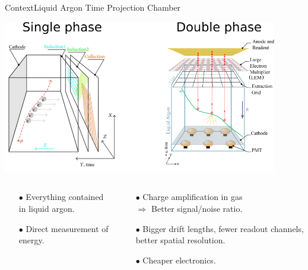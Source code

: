 \documentclass[10pt]{beamer}
\begin{document}
    \begin{frame}{Context}{Liquid Argon Time Projection Chamber}
    	\begin{scriptsize}
    			\includegraphics[width=0.9\textwidth]{figures/contexte/tpcs.png}\\\vfill
    			\begin{columns}
    				\begin{column}{0.5\textwidth}
    					\begin{itemize}
    						\item[$\bullet$] Everything contained in liquid argon.
    						\item[$\bullet$] Direct measurement of energy.
    					\end{itemize}
    				\end{column}\hfill
    				\begin{column}{0.5\textwidth}
    					\begin{itemize}
    						\item[$\bullet$] Charge amplification in gas\\$\Rightarrow$ Better signal/noise ratio.
    						\item[$\bullet$] Bigger drift lengths, fewer readout channels, better spatial resolution.
    						\item[$\bullet$] Cheaper electronics.
    					\end{itemize}
    				\end{column}
    			\end{columns}

\end{scriptsize}
\end{frame}
\end{document}
